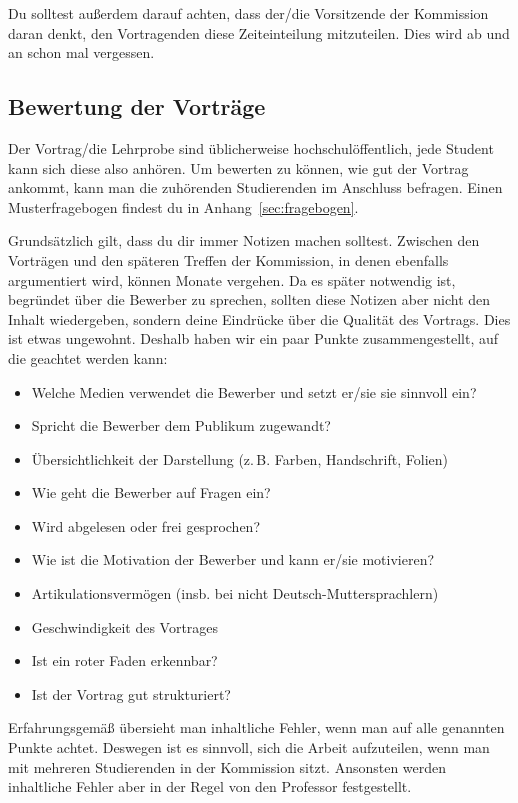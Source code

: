 Du solltest außerdem darauf achten, dass der/die Vorsitzende der Kommission daran denkt, den Vortragenden diese Zeiteinteilung mitzuteilen. Dies wird ab und an schon mal vergessen.

\subsection{Bewertung der Vorträge}
Der Vortrag/die Lehrprobe sind üblicherweise hochschulöffentlich, jede Student kann sich
diese also anhören. Um bewerten zu können, wie gut der Vortrag ankommt, kann man die zuhörenden Studierenden
im Anschluss befragen. Einen Musterfragebogen findest du in Anhang~\ref{sec:fragebogen}.

Grundsätzlich gilt, dass du dir immer Notizen machen solltest. Zwischen den Vorträgen und den späteren Treffen der Kommission, in denen ebenfalls argumentiert wird, können Monate vergehen.
Da es später notwendig ist, begründet über die Bewerber zu sprechen, sollten diese Notizen aber nicht den Inhalt wiedergeben, sondern deine Eindrücke über die Qualität des Vortrags. Dies ist etwas ungewohnt. Deshalb haben wir ein paar Punkte zusammengestellt, auf die geachtet werden kann:
\begin{itemize} %
    \item Welche Medien verwendet die Bewerber und setzt er/sie sie sinnvoll ein?
    \item Spricht die Bewerber dem Publikum zugewandt?
    \item Übersichtlichkeit der Darstellung (z.\,B. Farben, Handschrift, Folien)
    \item Wie geht die Bewerber auf Fragen ein?
    \item Wird abgelesen oder frei gesprochen?
    \item Wie ist die Motivation der Bewerber und kann er/sie motivieren?
    \item Artikulationsvermögen (insb. bei nicht Deutsch-Muttersprachlern)
    \item Geschwindigkeit des Vortrages
    \item Ist ein roter Faden erkennbar?
    \item Ist der Vortrag gut strukturiert?
\end{itemize}
Erfahrungsgemäß übersieht man inhaltliche Fehler, wenn man auf alle genannten Punkte achtet. Deswegen ist es sinnvoll, sich die Arbeit aufzuteilen, wenn man mit mehreren Studierenden in der Kommission sitzt. Ansonsten werden inhaltliche Fehler aber in der Regel von den Professor festgestellt.

